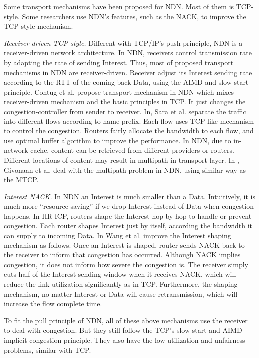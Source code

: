
Some transport mechanisms have been proposed for NDN. Most of them is TCP-style. Some researchers use NDN's features, such as the NACK, to improve the TCP-style mechanism.

\emph{Receiver driven TCP-style.} Different with TCP/IP's push principle, NDN is a receiver-driven network architecture. In NDN, receivers control transmission rate by adapting the rate of sending Interest. Thus, most of proposed transport mechanisms in NDN are receiver-driven. Receiver adjust its Interest sending rate according to the RTT of the coming back Data, using the AIMD and slow start principle. Contug et al.\cite{Contug} propose transport mechanism in NDN which mixes receiver-driven mechanism and the basic principles in TCP. It just changes the congestion-controller from sender to receiver. In\cite{Flow}, Sara et al. separate the traffic into different flows according to name prefix. Each flow uses TCP-like mechanism to control the congestion. Routers fairly allocate the bandwidth to each flow, and use optimal buffer algorithm to improve the performance. In NDN, due to in-network cache, content can be retrieved from different providers or routers. Different locations of content may result in multipath in transport layer. In \cite{Multipath}, Givonaan et al. deal with the multipath problem in NDN, using similar way as the MTCP.

\emph{Interest NACK.} In NDN an Interest is much smaller than a Data. Intuitively, it is much more ``resource-saving'' if we drop Interest instead of Data when congestion happens. In HR-ICP\cite{shape}, routers shape the Interest hop-by-hop to handle or prevent congestion. Each router shapes Interest just by itself, according the bandwidth it can supply to incoming Data. In \cite{improveshape} Wang et al. improve the Interest shaping mechanism as follows. Once an Interest is shaped, router sends NACK back to the receiver to inform that congestion has occurred. Although NACK implies congestion, it does not inform how severe the congestion is. The receiver simply cuts half of the Interest sending window when it receives NACK, which will reduce the link utilization significantly as in TCP. Furthermore, the shaping mechanism, no matter Interest or Data will cause retransmission, which will increase the flow complete time.

To fit the pull principle of NDN, all of these above mechanisms use the receiver to deal with congestion. But they still follow the TCP's slow start and AIMD implicit congestion principle. They also have the low utilization and unfairness problems, similar with TCP\cite{NDNanalysis}.
